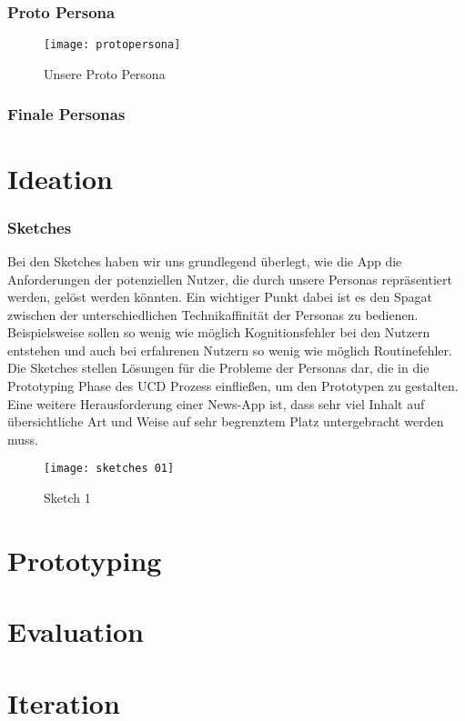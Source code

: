 \clearpage

\subsubsection{Proto Persona}

\begin{figure}[h]
  \centering
  \texttt{[image: protopersona]}
  \caption{Unsere Proto Persona}
  \label{protopersona}
\end{figure}

\subsubsection{Finale Personas}

\clearpage

\section{Ideation}

\subsubsection{Sketches}

Bei den Sketches haben wir uns grundlegend überlegt, wie die App die Anforderungen der potenziellen Nutzer, die durch unsere Personas repräsentiert werden, gelöst werden könnten. Ein wichtiger Punkt dabei ist es den Spagat zwischen der unterschiedlichen Technikaffinität der Personas zu bedienen. Beispielsweise sollen so wenig wie möglich Kognitionsfehler bei den Nutzern entstehen und auch bei erfahrenen Nutzern so wenig wie möglich Routinefehler. Die Sketches stellen Lösungen für die Probleme der Personas dar, die in die Prototyping Phase des UCD Prozess einfließen, um den Prototypen zu gestalten. Eine weitere Herausforderung einer News-App ist, dass sehr viel Inhalt auf übersichtliche Art und Weise auf sehr begrenztem Platz untergebracht werden muss.

\begin{figure}[h]
  \texttt{[image: sketches 01]}
  \caption{Sketch 1}
  \label{}
\end{figure}



\section{Prototyping}
\section{Evaluation}
\section{Iteration}
